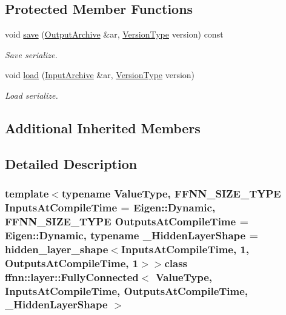 \subsection*{Protected Member Functions}
\begin{DoxyCompactItemize}
\item 
void \hyperlink{classffnn_1_1layer_1_1_fully_connected_a7c79eb99c638b61f76ea34b725c0aeef}{save} (\hyperlink{classffnn_1_1traits_1_1_serializable_a08d986df75d363fa79506d4f6045cb9f}{Output\-Archive} \&ar, \hyperlink{classffnn_1_1traits_1_1_serializable_a08924b3b7d20cb3cb6eafe517d4f7b30}{Version\-Type} version) const 
\begin{DoxyCompactList}\small\item\em Save serialize. \end{DoxyCompactList}\item 
void \hyperlink{classffnn_1_1layer_1_1_fully_connected_a1ff2a601cdf315ce46a2812b4e6fe354}{load} (\hyperlink{classffnn_1_1traits_1_1_serializable_a6e626759259f8f370dd4303b4441a234}{Input\-Archive} \&ar, \hyperlink{classffnn_1_1traits_1_1_serializable_a08924b3b7d20cb3cb6eafe517d4f7b30}{Version\-Type} version)
\begin{DoxyCompactList}\small\item\em Load serialize. \end{DoxyCompactList}\end{DoxyCompactItemize}
\subsection*{Additional Inherited Members}


\subsection{Detailed Description}
\subsubsection*{template$<$typename Value\-Type, F\-F\-N\-N\-\_\-\-S\-I\-Z\-E\-\_\-\-T\-Y\-P\-E Inputs\-At\-Compile\-Time = Eigen\-::\-Dynamic, F\-F\-N\-N\-\_\-\-S\-I\-Z\-E\-\_\-\-T\-Y\-P\-E Outputs\-At\-Compile\-Time = Eigen\-::\-Dynamic, typename \-\_\-\-Hidden\-Layer\-Shape = hidden\-\_\-layer\-\_\-shape$<$\-Inputs\-At\-Compile\-Time, 1, Outputs\-At\-Compile\-Time, 1$>$$>$class ffnn\-::layer\-::\-Fully\-Connected$<$ Value\-Type, Inputs\-At\-Compile\-Time, Outputs\-At\-Compile\-Time, \-\_\-\-Hidden\-Layer\-Shape $>$}

